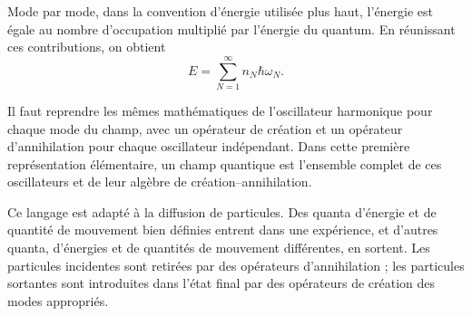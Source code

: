 Mode par mode, dans la convention d’énergie utilisée plus haut, l’énergie est égale au nombre d’occupation multiplié par l’énergie du quantum. En réunissant ces contributions, on obtient
\begin{equation}
E=\sum_{N=1}^{\infty} n_N\hbar\omega_N.
\end{equation}

Il faut reprendre les mêmes mathématiques de l’oscillateur harmonique pour chaque mode du champ, avec un opérateur de création et un opérateur d’annihilation pour chaque oscillateur indépendant. Dans cette première représentation élémentaire, un champ quantique est l’ensemble complet de ces oscillateurs et de leur algèbre de création--annihilation.

Ce langage est adapté à la diffusion de particules. Des quanta d’énergie et de quantité de mouvement bien définies entrent dans une expérience, et d’autres quanta, d’énergies et de quantités de mouvement différentes, en sortent. Les particules incidentes sont retirées par des opérateurs d’annihilation ; les particules sortantes sont introduites dans l’état final par des opérateurs de création des modes appropriés.

\begin{classroomqa}
\end{classroomqa}